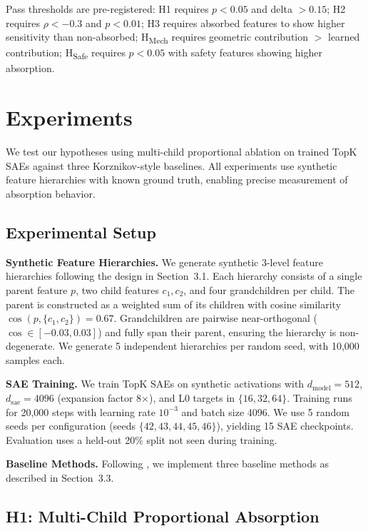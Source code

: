 \documentclass{article}
\begin{document}
Pass thresholds are pre-registered: H1 requires $p < 0.05$ and delta $> 0.15$; H2 requires $\rho < -0.3$ and $p < 0.01$; H3 requires absorbed features to show higher sensitivity than non-absorbed; H\textsubscript{Mech} requires geometric contribution $>$ learned contribution; H\textsubscript{Safe} requires $p < 0.05$ with safety features showing higher absorption.

\section{Experiments}

We test our hypotheses using multi-child proportional ablation on trained TopK SAEs against three Korznikov-style baselines. All experiments use synthetic feature hierarchies with known ground truth, enabling precise measurement of absorption behavior.

\subsection{Experimental Setup}

\textbf{Synthetic Feature Hierarchies.} We generate synthetic 3-level feature hierarchies following the design in Section~3.1. Each hierarchy consists of a single parent feature $p$, two child features $c_1, c_2$, and four grandchildren per child. The parent is constructed as a weighted sum of its children with cosine similarity $\cos(p, \{c_1, c_2\}) = 0.67$. Grandchildren are pairwise near-orthogonal ($\cos \in [-0.03, 0.03]$) and fully span their parent, ensuring the hierarchy is non-degenerate. We generate 5 independent hierarchies per random seed, with 10,000 samples each.

\textbf{SAE Training.} We train TopK SAEs on synthetic activations with $d_{\text{model}}=512$, $d_{\text{sae}}=4096$ (expansion factor 8$\times$), and L0 targets in $\{16, 32, 64\}$. Training runs for 20,000 steps with learning rate $10^{-3}$ and batch size 4096. We use 5 random seeds per configuration (seeds $\{42, 43, 44, 45, 46\}$), yielding 15 SAE checkpoints. Evaluation uses a held-out 20\% split not seen during training.

\textbf{Baseline Methods.} Following \citet{korznikov2026}, we implement three baseline methods as described in Section~3.3.

\subsection{H1: Multi-Child Proportional Absorption}
\end{document}
